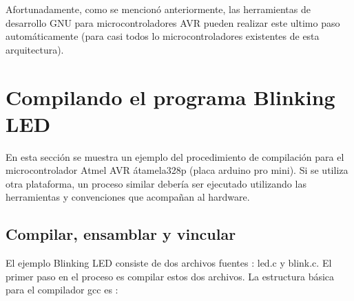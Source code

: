 \documentclass[12pt]{article}
\begin{document}
Afortunadamente, como se mencionó anteriormente, las herramientas de desarrollo
GNU para microcontroladores AVR pueden realizar este ultimo paso automáticamente
(para casi todos lo microcontroladores existentes de esta arquitectura).

\section *{Compilando el programa Blinking LED}

En esta sección se muestra un ejemplo del procedimiento de compilación 
para el microcontrolador Atmel AVR átamela328p (placa arduino pro mini).
Si se utiliza otra plataforma, un proceso similar debería ser ejecutado
utilizando las herramientas y convenciones que acompañan al hardware.


\subsection {Compilar, ensamblar y vincular}

El ejemplo Blinking LED consiste de dos archivos fuentes : led.c y blink.c.
El primer paso en el proceso es compilar estos dos archivos.
La estructura básica para el compilador gcc es :
\end{document}
